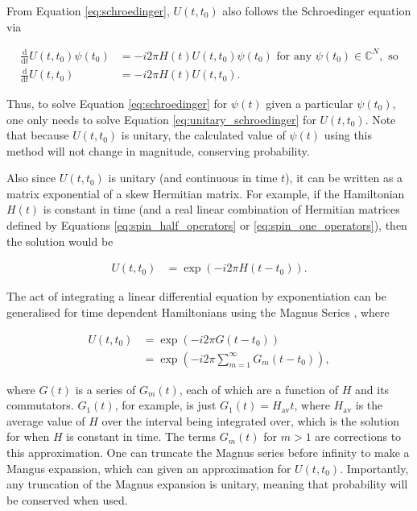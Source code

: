 \documentclass{jors}
\begin{document}
			From Equation \eqref{eq:schroedinger}, \(U(t, t_0)\) also follows the Schroedinger equation via

			\begin{align}
				\frac{\mathrm{d}}{\mathrm{d}t}U(t, t_0)\psi(t_0) &= -i2\pi H(t)U(t, t_0)\psi(t_0)\textrm{ for any }\psi(t_0)\in\mathbb{C}^N,\textrm{ so}\\
				\frac{\mathrm{d}}{\mathrm{d}t}U(t, t_0) &= -i2\pi H(t)U(t, t_0).\label{eq:unitary_schroedinger}
			\end{align}

			Thus, to solve Equation \eqref{eq:schroedinger} for \(\psi(t)\) given a particular \(\psi(t_0)\), one only needs to solve Equation \eqref{eq:unitary_schroedinger} for \(U(t, t_0)\). Note that because \(U(t, t_0)\) is unitary, the calculated value of \(\psi(t)\) using this method will not change in magnitude, conserving probability.

			Also since \(U(t, t_0)\) is unitary (and continuous in time \(t\)), it can be written as a matrix exponential of a skew Hermitian matrix. For example, if the Hamiltonian \(H(t)\) is constant in time (and a real linear combination of Hermitian matrices defined by Equations \eqref{eq:spin_half_operators} or \eqref{eq:spin_one_operators}), then the solution would be

			\begin{align}
				U(t, t_0) &= \exp(-i2\pi H(t - t_0)).
			\end{align}

			The act of integrating a linear differential equation by exponentiation can be generalised for time dependent Hamiltonians using the Magnus Series \cite{blanes_magnus_2009}, where
			
			\begin{align}
				U(t, t_0) &= \exp(-i2\pi G(t - t_0))\\
				&= \exp(-i2\pi \sum_{m = 1}^\infty G_m(t - t_0)),
			\end{align}

			where \(G(t)\) is a series of \(G_m(t)\), each of which are a function of \(H\) and its commutators. \(G_1(t)\), for example, is just \(G_1(t) = H_\mathrm{av}t\), where \(H_\mathrm{av}\) is the average value of \(H\) over the interval being integrated over, which is the solution for when \(H\) is constant in time. The terms \(G_m(t)\) for \(m > 1\) are corrections to this approximation. One can truncate the Magnus series before infinity to make a Mangus expansion, which can given an approximation for \(U(t, t_0)\). Importantly, any truncation of the Magnus expansion is unitary, meaning that probability will be conserved when used.
\end{document}
